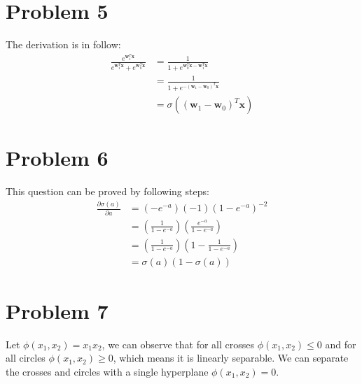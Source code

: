 \documentclass[12pt]{scrartcl}
\newcommand{\vect}[1]{\boldsymbol{#1}}
\begin{document}
  \section*{Problem 5}

  The derivation is in follow:
  \begin{equation*}
    \begin{split}
	    \frac{e^{\vect{w}_1^T\vect{x}}}{e^{\vect{w}_1^T\vect{x}}+e^{\vect{w}_0^T\vect{x}}} &= \frac{1}{1+e^{\vect{w}_0^T\vect{x}-\vect{w}_1^T\vect{x}}} \\
      &= \frac{1}{1+e^{-(\vect{w}_1-\vect{w}_0)^T\vect{x}}}\\
      &= \sigma\left( (\vect{w}_1-\vect{w}_0)^T\vect{x} \right)
    \end{split}
  \end{equation*}
  


  \section*{Problem 6}
  This question can be proved by following steps:
    \begin{equation*}
    \begin{aligned}
    \frac{\partial \sigma(a)}{\partial a} 
                &= (-e^{-a})(-1)(1 - e^{-a})^{-2}\\
                &= \left(\frac{1}{1 - e^{-a}} \right)\left(\frac{e^{-a}}{1 - e^{-a}}\right)\\
                &=\left(\frac{1}{1 - e^{-a}}\right)\left(1-\frac{1}{1 - e^{-a}}\right)\\
                &=\sigma(a)(1-\sigma(a))
    \end{aligned}
  \end{equation*} 
  \section*{Problem 7}
  Let $\phi\left( x_1,x_2 \right) = x_1x_2 $, we can observe that for all crosses $\phi\left( x_1, x_2 \right) \le 0$ 
  and for all circles $\phi\left( x_1, x_2 \right)  \ge  0$, which means it is linearly separable.
  We can separate the crosses and circles with a single hyperplane $\phi\left( x_1, x_2 \right) = 0$.
\end{document}
